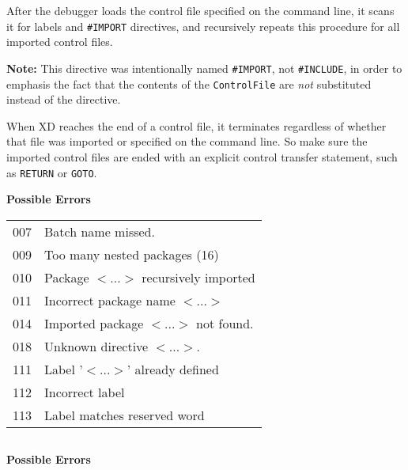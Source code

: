 After the debugger loads the control file specified on the
command line, it scans it for labels and \verb'#IMPORT' directives,
and recursively repeats this procedure for all imported
control files.

{\bf Note:} This directive was intentionally named \verb'#IMPORT',
not \verb'#INCLUDE', in order to emphasis the fact that the
contents of the \verb'ControlFile' are {\it not} substituted
instead of the directive.

When XD reaches the end of a control file, it terminates regardless
of whether that file was imported or specified on the command line.
So make sure the imported control files are ended with an explicit
control transfer statement, such as \verb'RETURN' or \verb'GOTO'.

{\samepage
{\bf Possible Errors}
\begin{flushleft}
\begin{tabular}{ll}
007 & Batch name missed.                 \\
009 & Too many nested packages (16)      \\
010 & Package $<$...$>$ recursively imported \\
011 & Incorrect package name $<$...$>$       \\
014 & Imported package $<$...$>$ not found.  \\
018 & Unknown directive $<$...$>$.           \\
111 & Label '$<$...$>$' already defined      \\
112 & Incorrect label                    \\
113 & Label matches reserved word
\end{tabular}
\end{flushleft}
} %
{} %

\ifcomment

{\samepage
\Frame{}{}
\begin{verbatim}

\end{verbatim}

} %

{\samepage
{\bf Possible Errors}
\begin{flushleft}
\begin{tabular}{ll}

\end{tabular}
\end{flushleft}
} %
{} %

\fi


